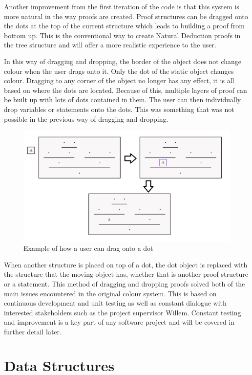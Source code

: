 Another improvement from the first iteration of the code is that this system is more natural in the way proofs are created. Proof structures can be dragged onto the dots at the top of the current structure which leads to building a proof from bottom up. This is the conventional way to create Natural Deduction proofs in the tree structure and will offer a more realistic experience to the user.

In this way of dragging and dropping, the border of the object does not change colour when the user drags onto it. Only the dot of the static object changes colour. Dragging to any corner of the object no longer has any effect, it is all based on where the dots are located. Because of this, multiple layers of proof can be built up with lots of dots contained in them. The user can then individually drop variables or statements onto the dots. This was something that was not possible in the previous way of dragging and dropping.

\begin{figure}[H]
\centering
\centerline{\includegraphics[scale=0.5]{dotsdnd}}
\caption{Example of how a user can drag onto a dot}
 \label{fig:dotsdnd}
\end{figure}

When another structure is placed on top of a dot, the dot object is replaced with the structure that the moving object has, whether that is another proof structure or a statement. This method of dragging and dropping proofs solved both of the main issues encountered in the original colour system. This is based on continuous development and unit testing as well as constant dialogue with interested stakeholders such as the project supervisor Willem. Constant testing and improvement is a key part of any software project and will be covered in further detail later.  

\section{Data Structures}


